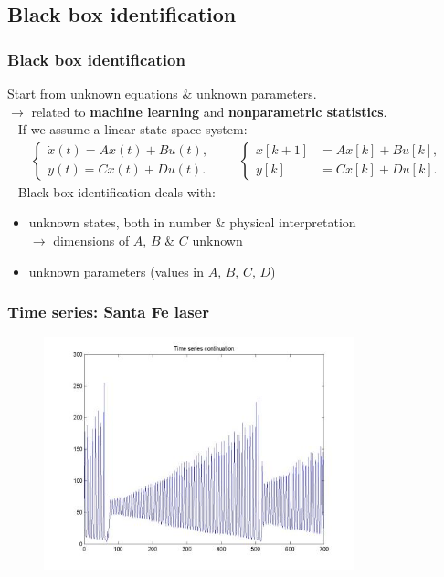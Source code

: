 \subsection{Black box identification}
\begin{frame}
	\frametitle{Black box identification}
	Start from unknown equations $\&$ unknown parameters. \\
	$\rightarrow$ related to \textbf{machine learning} and \textbf{nonparametric statistics}. \\
	\pause
	\ \newline
	If we assume a linear state space system:
	\begin{align*}
	\left\{ \begin{matrix} 
	\dot{x}(t) = A x(t) + B u(t), \\ 
	y(t) = C x(t) + D u(t).
	\end{matrix}\right.\quad\quad
	\left\{ \begin{matrix} 
	x[k+1] &= A x[k] + B u[k], \\ 
	y[k] &= C x[k] + D u[k].
	\end{matrix}\right.
	\end{align*}
	\pause
	\ \newline
	Black box identification deals with:
	\pause
	\begin{itemize}
		\item unknown states, both in number $\&$ physical interpretation \\
		\pause
		$\rightarrow$ dimensions of $A$, $B$ $\&$ $C$ unknown
		\pause
		\item unknown parameters (values in $A$, $B$, $C$, $D$)
	\end{itemize}
\end{frame}

\begin{frame}
	\frametitle{Time series: Santa Fe laser}
	\begin{figure}[!h]
		\centering
		\includegraphics[width=0.8\textwidth]{img/santafe-full.jpg}
	\end{figure}
\end{frame}

